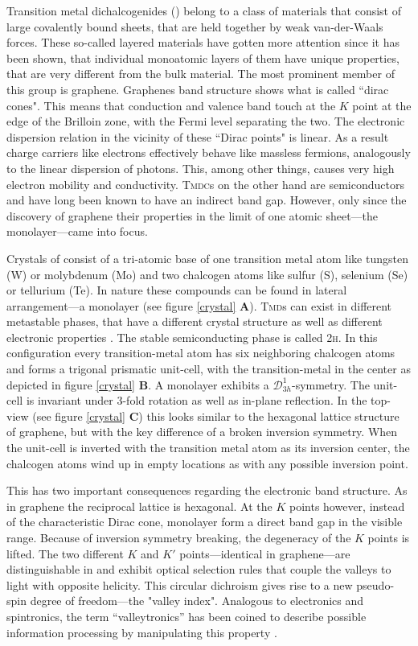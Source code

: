 Transition metal dichalcogenides (\tmds\!) belong to a class of materials that consist of large covalently bound sheets, that are held together by weak van-der-Waals forces. These so-called layered materials have gotten more attention since it has been shown, that individual monoatomic layers of them have unique properties, that are very different from the bulk material. The most prominent member of this group is graphene. Graphenes band structure shows what is called ``dirac cones". This means that conduction and valence band touch at the $K$ point at the edge of the Brilloin zone, with the Fermi level separating the two. The electronic dispersion relation in the vicinity of these ``Dirac points" is linear. As a result charge carriers like electrons effectively behave like massless fermions, analogously to the linear dispersion of photons. This, among other things, causes very high electron mobility and conductivity. \textsc{Tmdc}s on the other hand are semiconductors and have long been known to have an indirect band gap. However, only since the discovery of graphene their properties in the limit of one atomic sheet---the monolayer---came into focus. 

Crystals of \tmds consist of a tri-atomic base of one transition metal atom like tungsten (W) or molybdenum (Mo) and two chalcogen atoms like sulfur (S), selenium (Se) or tellurium (Te). In nature these compounds can be found in lateral arrangement---a \tmdg monolayer (see figure \ref{crystal} \textbf{A}). \textsc{Tmd}s can exist in different metastable phases, that have a different crystal structure as well as different electronic properties \cite{ouyang_phase_2015}. The stable semiconducting phase is called 2\textsc{h}. In this configuration every transition-metal atom has six neighboring chalcogen atoms and forms a trigonal prismatic unit-cell, with the transition-metal in the center as depicted in figure \ref{crystal} \textbf{B}. A \tmdg monolayer exhibits a $\mathcal{D}^1_{3h}$-symmetry. The unit-cell is invariant under 3-fold rotation as well as in-plane reflection. In the top-view (see figure \ref{crystal} \textbf{C}) this looks similar to the hexagonal lattice structure of graphene, but with the key difference of a broken inversion symmetry. When the unit-cell is inverted with the transition metal atom as its inversion center, the chalcogen atoms wind up in empty locations as with any possible inversion point.

This has two important consequences regarding the electronic band structure. As in graphene the reciprocal lattice is hexagonal. At the $K$ points however, instead of the characteristic Dirac cone, monolayer \tmds form a direct band gap in the visible range. Because of inversion symmetry breaking, the degeneracy of the $K$ points is lifted. The two different $K$ and $K'$ points---identical in graphene---are distinguishable in \tmds and exhibit optical selection rules that couple the valleys to light with opposite helicity. This circular dichroism gives rise to a new pseudo-spin degree of freedom---the "valley index". Analogous to electronics and spintronics, the term ``valleytronics'' has been coined to describe possible information processing by manipulating this property \cite{wang_electronics_2012, xiao_coupled_2012}. 

